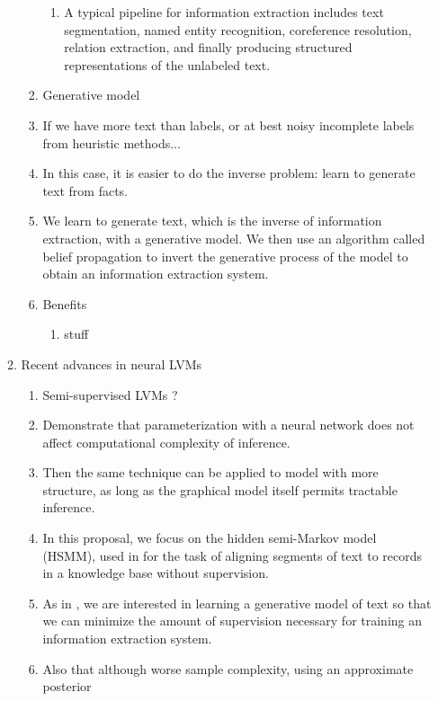 \documentclass[12pt]{article}
\begin{document}
\begin{enumerate}
\begin{enumerate}
\begin{enumerate}
\begin{enumerate}
            \item A typical pipeline for information extraction includes
                text segmentation, named entity recognition, coreference resolution,
                relation extraction, and finally producing structured representations of the unlabeled text.
            \end{enumerate}
    \item Generative model
        \item If we have more text than labels, or at best noisy incomplete labels from heuristic methods...
        \item In this case, it is easier to do the inverse problem: learn to generate
            text from facts.
        \item We learn to generate text, which is the inverse of information extraction, with a generative model.
            We then use an algorithm called belief propagation to invert the
            generative process of the model to obtain an information extraction system.
        \item Benefits
            \begin{enumerate}
            \item stuff
            \end{enumerate}
        \end{enumerate}
    \item Recent advances in neural LVMs
        \begin{enumerate}
        \item Semi-supervised LVMs \citet{kingma2014ssvae}?
        \item Demonstrate that parameterization with a neural network does not affect computational
            complexity of inference.
        \item Then the same technique can be applied to model with more structure,
            as long as the graphical model itself permits tractable inference.
        \item In this proposal, we focus on the hidden semi-Markov model (HSMM),
            used in \citet{liang2009semalign} for the task of aligning segments of text to
            records in a knowledge base without supervision. 
        \item As in \citet{liang2009semalign}, we are interested in learning a generative model of text so that
            we can minimize the amount of supervision necessary for training an
            information extraction system.
        \item Also that although worse sample complexity, using an approximate posterior

\end{enumerate}
\end{enumerate}
\end{enumerate}
\end{document}
